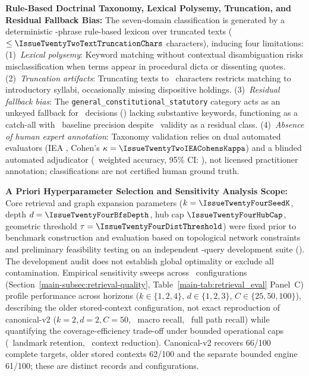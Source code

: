 \item \textbf{Rule-Based Doctrinal Taxonomy, Lexical Polysemy, Truncation, and Residual Fallback Bias:}
The seven-domain classification is generated by a deterministic \IssueTwentyTwoTotalLexiconPhrases-phrase rule-based lexicon over truncated texts ($\le \IssueTwentyTwoTextTruncationChars$ characters), inducing four limitations: (1)~\textit{Lexical polysemy}: Keyword matching without contextual disambiguation risks misclassification when terms appear in procedural dicta or dissenting quotes. (2)~\textit{Truncation artifacts}: Truncating texts to \IssueTwentyTwoTextTruncationChars\ characters restricts matching to introductory syllabi, occasionally missing dispositive holdings. (3)~\textit{Residual fallback bias}: The \texttt{general\_\allowbreak{}constitutional\_\allowbreak{}statutory} category acts as an unkeyed fallback for \IssueTwentyTwoGeneralConstitutionalCorpus\ decisions (\IssueTwentyTwoGeneralConstitutionalCorpusPct) lacking substantive keywords, functioning as a catch-all with \IssueTwentyTwoGeneralConstitutionalBaselineAcc\ baseline precision despite \IssueTwentyTwoFallbackValidityPct\ validity as a residual class. (4)~\textit{Absence of human expert annotation}: Taxonomy validation relies on dual automated evaluators (IEA \IssueTwentyTwoIEARawAgreement, Cohen's $\kappa=\IssueTwentyTwoIEACohensKappa$) and a blinded automated adjudicator (\IssueTwentyTwoHorvitzThompsonAccuracy\ weighted accuracy, 95\% CI: \IssueTwentyTwoHorvitzThompsonCI), not licensed practitioner annotation; classifications are not certified human ground truth.

\item \textbf{A Priori Hyperparameter Selection and Sensitivity Analysis Scope:} Core retrieval and graph expansion parameters ($k=\IssueTwentyFourSeedK$, depth $d=\IssueTwentyFourBfsDepth$, hub cap $\IssueTwentyFourHubCap$, geometric threshold $\tau=\IssueTwentyFourDistThreshold$) were fixed prior to benchmark construction and evaluation based on topological network constraints and preliminary feasibility testing on an independent \IssueTwentyFourDevQueryCount-query development suite (\IssueTwentyFourDevDate). The development audit does not establish global optimality or exclude all contamination. Empirical sensitivity sweeps across \IssueTwentySixConfigCount\ configurations (Section~\ref{main-subsec:retrieval-quality}, Table~\ref{main-tab:retrieval_eval} Panel~C) profile performance across horizons ($k \in \{1,2,4\}$, $d \in \{1,2,3\}$, $C \in \{25,50,100\}$), describing the older stored-context configuration, not exact reproduction of canonical-v2 ($k=2, d=2, C=50$, \IssueTwentySixHistMacro\ macro recall, \IssueTwentySixHistFullPath\ full path recall) while quantifying the coverage-efficiency trade-off under bounded operational caps (\IssueTwentySixGoldRetentionPct\ landmark retention, \IssueTwentySixContextReductionPct\ context reduction). Canonical-v2 recovers 66/100 complete targets, older stored contexts 62/100 and the separate bounded engine 61/100; these are distinct records and configurations.

